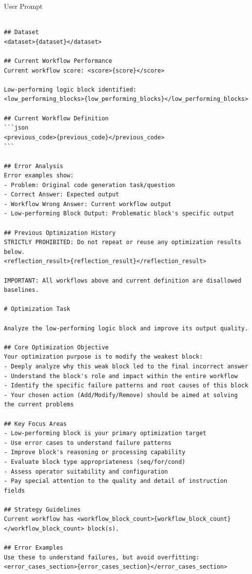 \documentclass{article}
\theoremstyle{plain}
\theoremstyle{definition}
\theoremstyle{remark}
\begin{document}
\begin{promptbox}{User Prompt}
\begin{Verbatim}[fontsize=\small]

## Dataset
<dataset>{dataset}</dataset>

## Current Workflow Performance
Current workflow score: <score>{score}</score>

Low-performing logic block identified:
<low_performing_blocks>{low_performing_blocks}</low_performing_blocks>

## Current Workflow Definition
```json
<previous_code>{previous_code}</previous_code>
```

## Error Analysis
Error examples show:
- Problem: Original code generation task/question
- Correct Answer: Expected output
- Workflow Wrong Answer: Current workflow output
- Low-performing Block Output: Problematic block's specific output

## Previous Optimization History
STRICTLY PROHIBITED: Do not repeat or reuse any optimization results below.
<reflection_result>{reflection_result}</reflection_result>

IMPORTANT: All workflows above and current definition are disallowed baselines.

# Optimization Task

Analyze the low-performing logic block and improve its output quality.

## Core Optimization Objective
Your optimization purpose is to modify the weakest block:
- Deeply analyze why this weak block led to the final incorrect answer
- Understand the block's role and impact within the entire workflow
- Identify the specific failure patterns and root causes of this block
- Your chosen action (Add/Modify/Remove) should be aimed at solving the current problems

## Key Focus Areas
- Low-performing block is your primary optimization target
- Use error cases to understand failure patterns
- Improve block's reasoning or processing capability
- Evaluate block type appropriateness (seq/for/cond)
- Assess operator suitability and configuration
- Pay special attention to the quality and detail of instruction fields

## Strategy Guidelines
Current workflow has <workflow_block_count>{workflow_block_count}</workflow_block_count> block(s).

## Error Examples
Use these to understand failures, but avoid overfitting:
<error_cases_section>{error_cases_section}</error_cases_section>

\end{Verbatim}
\end{promptbox}
\end{document}
